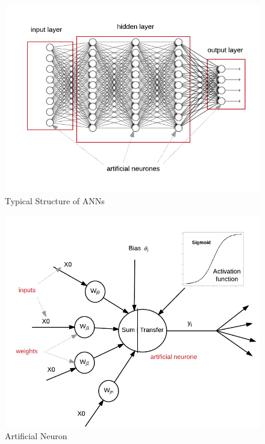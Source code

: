 \begin{figure}[!h]
\begin{center}
        \includegraphics[width=0.7\textheight]{img/ann.png}
        \caption{Typical Structure of ANNs}  \label{fig:ann}
\end{center}
\end{figure}


\begin{figure}[!h]
\begin{center}
        \includegraphics[width=0.6\textheight]{img/an.png}
        \caption{Artificial Neuron}  \label{fig:an}
\end{center}
\end{figure}

